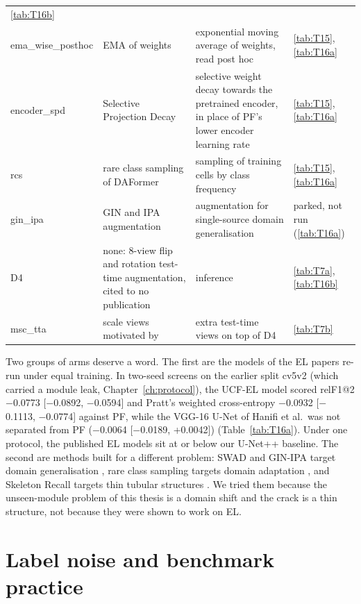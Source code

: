\begin{table}[htbp]
\begin{tabular}{>{\raggedright}p{3.4cm} >{\raggedright}p{4.1cm} >{\raggedright}p{4.0cm} >{\raggedright\arraybackslash}p{2.2cm}}
\ref{tab:T16b} \\
ema\_wise\_posthoc & EMA of weights \citep{moralesbrotons2024ema} & exponential moving average of weights, read post hoc &
\ref{tab:T15}, \ref{tab:T16a} \\
encoder\_spd & Selective Projection Decay \citep{tian2024spd} & selective weight decay towards the pretrained encoder,
in place of PF's lower encoder learning rate & \ref{tab:T15}, \ref{tab:T16a} \\
rcs & rare class sampling of DAFormer \citep{hoyer2022daformer} & sampling of training cells by class frequency &
\ref{tab:T15}, \ref{tab:T16a} \\
gin\_ipa & GIN and IPA augmentation \citep{ouyang2021gin} & augmentation for single-source domain generalisation &
parked, not run (\ref{tab:T16a}) \\
D4 & none: 8-view flip and rotation test-time augmentation, cited to no publication & inference & \ref{tab:T7a},
\ref{tab:T16b} \\
msc\_tta & scale views motivated by \citet{huang2026pie} & extra test-time views on top of D4 & \ref{tab:T7b} \\
\bottomrule
\end{tabular}
\end{table}

Two groups of arms deserve a word. The first are the models of the EL papers re-run under equal training. In two-seed screens
on the earlier split cv5v2 (which carried a module leak, Chapter~\ref{ch:protocol}), the UCF-EL model scored relF1@2 $-$0.0773
[$-$0.0892, $-$0.0594] and Pratt's weighted cross-entropy $-$0.0932 [$-$0.1113, $-$0.0774] against PF, while the VGG-16 U-Net
of Hanifi et al.\ was not separated from PF ($-$0.0064 [$-$0.0189, +0.0042]) (Table~\ref{tab:T16a}). Under one protocol, the
published EL models sit at or below our U-Net++ baseline. The second are methods built for a different problem: SWAD and
GIN-IPA target domain generalisation \citep{cha2021swad,ouyang2021gin}, rare class sampling targets domain adaptation
\citep{hoyer2022daformer}, and Skeleton Recall targets thin tubular structures
\citep{kirchhoff2024skeletonrecall}. We tried them because the unseen-module problem of this thesis is a domain shift and the
crack is a thin structure, not because they were shown to work on EL.

\section{Label noise and benchmark practice}\label{sec:rw_noise}

